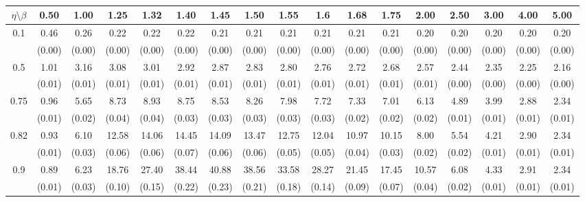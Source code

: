 \documentclass[12pt]{article}  %
\theoremstyle{plain}
\begin{document}
\begin{sidewaystable}[htbp]
\centering
{}
\label{ATS_10-7}
\ \\
\begin{tabular}{ccccccccccccccccc}
\hline
$\eta \setminus \beta $        & 0.50   & 1.00   & 1.25   & 1.32   & 1.40   & 1.45   & 1.50   & 1.55   & 1.6   & 1.68   & 1.75   & 2.00   & 2.50   & 3.00   & 4.00  &5.00 \\ \hline
\multirow{2}{*}{0.1}  & 0.46 &0.26 & 0.22 & 0.22  & 0.22  & 0.21  & 0.21  & 0.21  & 0.21  &0.21 & 0.21& 0.20& 0.20 &0.20& 0.20& 0.20\\
                      & (0.00) & (0.00) & (0.00) & (0.00) & (0.00) & (0.00) & (0.00) & (0.00) & (0.00) & (0.00) & (0.00) & (0.00) & (0.00) & (0.00) & (0.00) & (0.00)\\ \hline
\multirow{2}{*}{0.5}  & 1.01& 3.16 & 3.08 & 3.01 &  2.92 &  2.87  & 2.83  & 2.80 &  2.76 & 2.72  &2.68  &2.57& 2.44& 2.35 &2.25& 2.16 \\
                      & (0.01) & (0.01) & (0.01) & (0.01) & (0.01) & (0.01) & (0.01) & (0.01) & (0.01) & (0.01) & (0.01) & (0.01)  & (0.00) & (0.00) & (0.00)&(0.00)\\ \hline
\multirow{2}{*}{0.75}  & 0.96 &5.65 & 8.73 & 8.93  & 8.75 &  8.53&   8.26 &  7.98 &  7.72  &7.33 & 7.01& 6.13 &4.89 &3.99& 2.88 &2.34\\
                      & (0.01)&   (0.02)&  (0.04)&  (0.04)&  (0.03)&  (0.03)&  (0.03)&  (0.03)&  (0.03)&  (0.02)&  (0.02)&  (0.02)& (0.01)&  (0.01)& (0.01)& (0.01)\\ \hline
\multirow{2}{*}{0.82}  & 0.93 &6.10 &12.58& 14.06 & 14.45 & 14.09 & 13.47 & 12.75 & 12.04 &10.97 &10.15 &8.00& 5.54& 4.21& 2.90& 2.34\\
                      & (0.01)&   (0.03)&  (0.06)&  (0.06)&  (0.07)&  (0.06)&  (0.06)&  (0.05)&  (0.05)&  (0.04)&  (0.03)&  (0.02)& (0.02)& (0.01)& (0.01)& (0.01)\\ \hline
\multirow{2}{*}{0.9}  &0.89& 6.23& 18.76&27.40 & 38.44&  40.88 & 38.56 & 33.58 & 28.27 &21.45& 17.45 &10.57 &6.08 &4.33 &2.91& 2.34\\
                      & (0.01)&   (0.03)&  (0.10)&  (0.15)&  (0.22)&  (0.23)&  (0.21)&  (0.18)&  (0.14)&  (0.09)&  (0.07)&  (0.04)& (0.02)& (0.01)& (0.01)& (0.01)\\ \hline                                               

\end{tabular}
\end{sidewaystable}
\end{document}
